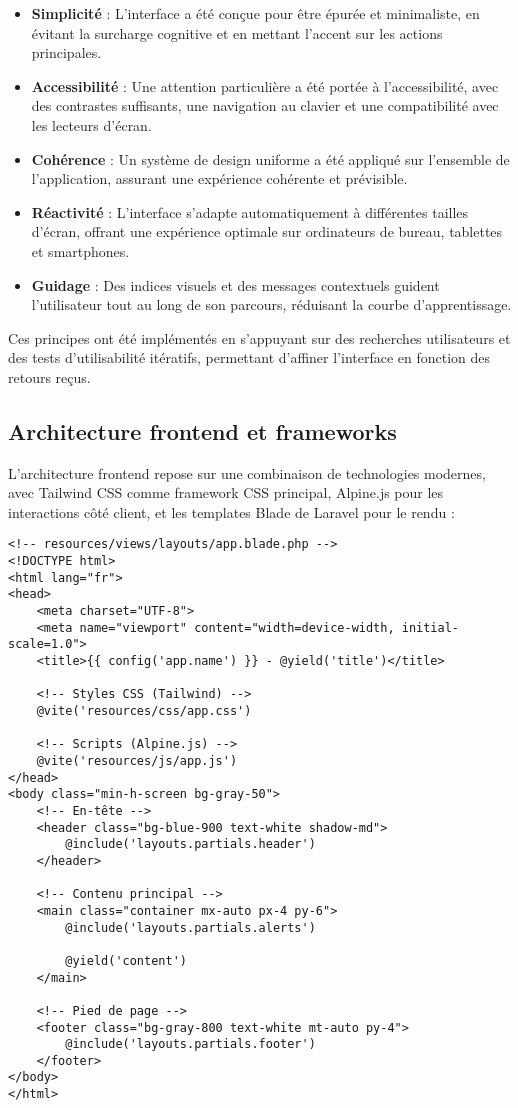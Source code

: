 \documentclass[french,12pt]{report} %
\begin{document}
\begin{itemize}
    \item \textbf{Simplicité} : L'interface a été conçue pour être épurée et minimaliste, en évitant la surcharge cognitive et en mettant l'accent sur les actions principales.
    \item \textbf{Accessibilité} : Une attention particulière a été portée à l'accessibilité, avec des contrastes suffisants, une navigation au clavier et une compatibilité avec les lecteurs d'écran.
    \item \textbf{Cohérence} : Un système de design uniforme a été appliqué sur l'ensemble de l'application, assurant une expérience cohérente et prévisible.
    \item \textbf{Réactivité} : L'interface s'adapte automatiquement à différentes tailles d'écran, offrant une expérience optimale sur ordinateurs de bureau, tablettes et smartphones.
    \item \textbf{Guidage} : Des indices visuels et des messages contextuels guident l'utilisateur tout au long de son parcours, réduisant la courbe d'apprentissage.
\end{itemize}

Ces principes ont été implémentés en s'appuyant sur des recherches utilisateurs et des tests d'utilisabilité itératifs, permettant d'affiner l'interface en fonction des retours reçus.

\subsection{Architecture frontend et frameworks}

L'architecture frontend repose sur une combinaison de technologies modernes, avec Tailwind CSS comme framework CSS principal, Alpine.js pour les interactions côté client, et les templates Blade de Laravel pour le rendu :

\begin{lstlisting}[style=htmlstyle,caption={Structure de base des templates Blade}]
<!-- resources/views/layouts/app.blade.php -->
<!DOCTYPE html>
<html lang="fr">
<head>
    <meta charset="UTF-8">
    <meta name="viewport" content="width=device-width, initial-scale=1.0">
    <title>{{ config('app.name') }} - @yield('title')</title>
    
    <!-- Styles CSS (Tailwind) -->
    @vite('resources/css/app.css')
    
    <!-- Scripts (Alpine.js) -->
    @vite('resources/js/app.js')
</head>
<body class="min-h-screen bg-gray-50">
    <!-- En-tête -->
    <header class="bg-blue-900 text-white shadow-md">
        @include('layouts.partials.header')
    </header>
    
    <!-- Contenu principal -->
    <main class="container mx-auto px-4 py-6">
        @include('layouts.partials.alerts')
        
        @yield('content')
    </main>
    
    <!-- Pied de page -->
    <footer class="bg-gray-800 text-white mt-auto py-4">
        @include('layouts.partials.footer')
    </footer>
</body>
</html>
\end{lstlisting}
\end{document}
